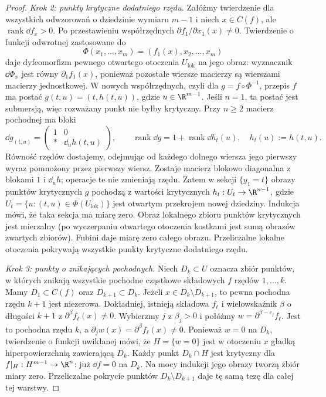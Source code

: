 \begin{proof}
\emph{Krok 2: punkty krytyczne dodatniego rzędu.}
Załóżmy twierdzenie dla wszystkich odwzorowań
o dziedzinie wymiaru $m-1$ i niech
$x\in C(f)$, ale $\operatorname{rank}\dd f_x>0$.
Po przestawieniu współrzędnych
$\partial f_1/\partial x_1(x)\ne0$.
Twierdzenie o funkcji odwrotnej zastosowane do
\[
 \Phi(x_1,\ldots,x_m)
       =(f_1(x),x_2,\ldots,x_m)
\]
daje dyfeomorfizm pewnego otwartego otoczenia $U_{\mathrm{lok}}$
na jego obraz: wyznacznik $\dd\Phi_x$ jest równy
$\partial_1f_1(x)$, ponieważ pozostałe wiersze
macierzy są wierszami macierzy jednostkowej.
W nowych współrzędnych, czyli dla $g=f\circ\Phi^{-1}$,
przepis $f$ ma postać
$g(t,u)=(t,h(t,u))$, gdzie $u\in\R^{m-1}$.
Jeśli $n=1$, ta postać jest submersją,
więc rozważany punkt nie byłby krytyczny.
Przy $n\geq2$ macierz pochodnej ma bloki
\[
 \dd g_{(t,u)}
  =\begin{pmatrix}
       1&0\\ *&\dd_u h(t,u)
    \end{pmatrix},
 \qquad
 \operatorname{rank}\dd g
      =1+\operatorname{rank}\dd h_t(u),
 \quad h_t(u):=h(t,u).
\]
Równość rzędów dostajemy, odejmując od każdego
dolnego wiersza jego pierwszy wyraz pomnożony
przez pierwszy wiersz. Zostaje macierz blokowo diagonalna
z blokami $1$ i $\dd_u h$; operacje te nie zmieniają rzędu.
Zatem w sekcji $\{y_1=t\}$ obrazy punktów
krytycznych $g$ pochodzą z wartości krytycznych
$h_t:U_t\to\R^{n-1}$, gdzie
$U_t=\{u:(t,u)\in\Phi(U_{\mathrm{lok}})\}$ jest otwartym
przekrojem nowej dziedziny. Indukcja mówi,
że taka sekcja ma miarę zero. Obraz lokalnego
zbioru punktów krytycznych jest mierzalny
(po wyczerpaniu otwartego otoczenia kostkami
jest sumą obrazów zwartych zbiorów).
Fubini daje miarę zero całego obrazu.
Przeliczalne lokalne otoczenia pokrywają
wszystkie punkty krytyczne dodatniego rzędu.

\emph{Krok 3: punkty o znikających pochodnych.}
Niech $D_k\subset U$ oznacza zbiór punktów,
w których znikają wszystkie pochodne cząstkowe
składowych $f$ rzędów $1,\ldots,k$.
Mamy $D_1\subset C(f)$ oraz
$D_{k+1}\subset D_k$. Jeżeli
$x\in D_k\setminus D_{k+1}$, to pewna pochodna
rzędu $k+1$ jest niezerowa. Dokładniej, istnieją
składowa $f_\ell$ i wielowskaźnik $\beta$ o długości
$k+1$ z $\partial^\beta f_\ell(x)\ne0$.
Wybierzmy $j$ z $\beta_j>0$ i połóżmy
$w=\partial^{\beta-e_j}f_\ell$.
Jest to pochodna rzędu $k$, a
$\partial_jw(x)=\partial^\beta f_\ell(x)\ne0$.
Ponieważ $w=0$ na $D_k$,
twierdzenie o funkcji uwikłanej mówi, że
$H=\{w=0\}$ jest w otoczeniu $x$ gładką
hiperpowierzchnią zawierającą $D_k$.
Każdy punkt $D_k\cap H$ jest krytyczny dla
$f|_H:H^{m-1}\to\R^n$: już $\dd f=0$
na $D_k$. Na mocy indukcji jego obrazy
tworzą zbiór miary zero. Przeliczalne
pokrycie punktów $D_k\setminus D_{k+1}$
daje tę samą tezę dla całej tej warstwy.


\end{proof}
